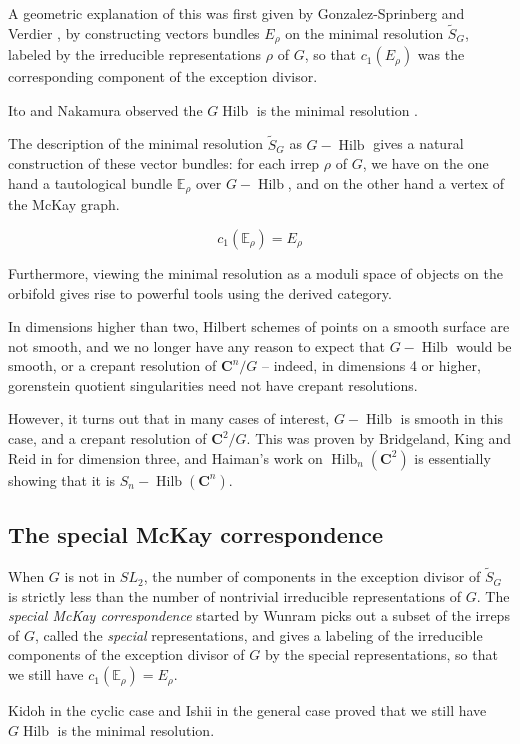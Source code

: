 \documentclass{amsart}[12pt]
\theoremstyle{definition}
\newcommand{\C}{\mathbf{C}}
\DeclareMathOperator{\Hilb}{Hilb}
\begin{document}
A geometric explanation of this was first given by Gonzalez-Sprinberg and Verdier \cite{GSV}, by constructing vectors bundles $E_\rho$ on the minimal resolution $\widetilde{S}_G$, labeled by the irreducible representations $\rho$ of $G$, so that $c_1(E_\rho)$ was the corresponding component of the exception divisor.

Ito and Nakamura observed the $G\Hilb$ is the minimal resolution \cite{IN}.

The description of the minimal resolution $\widetilde{S}_G$ as $G-\Hilb$ gives a natural construction of these vector bundles: for each irrep $\rho$ of $G$, we have on the one hand a tautological bundle $\mathbb{E}_\rho$ over $G-\Hilb$, and on the other hand a vertex of the McKay graph.  

$$c_1(\mathbb{E}_\rho)=E_\rho$$

Furthermore, viewing the minimal resolution as a moduli space of objects on the orbifold gives rise to powerful tools using the derived category.  

In dimensions higher than two, Hilbert schemes of points on a smooth surface are not smooth, and we no longer have any reason to expect that $G-\Hilb$ would be smooth, or a crepant resolution of $\C^n/G$ -- indeed, in dimensions 4 or higher, gorenstein quotient singularities need not have crepant resolutions.

However, it turns out that in many cases of interest, $G-\Hilb$ is smooth in this case, and a crepant resolution of $\C^2/G$.  This was proven by Bridgeland, King and Reid in \cite{BKR} for dimension three, and Haiman's work on $\Hilb_n(\C^2)$ is essentially showing that it is $S_n-\Hilb(\C^n)$.



\subsection{The special McKay correspondence}

When $G$ is not in $SL_2$, the number of components in the exception divisor of $\widetilde{S}_G$ is strictly less than the number of nontrivial irreducible representations of $G$.  The \emph{special McKay correspondence} started by Wunram \cite{wunram} picks out a subset of the irreps of $G$, called the \emph{special} representations, and gives a labeling of the irreducible components of the exception divisor of $G$ by the special representations, so that we still have $c_1(\mathbb{E}_\rho)=E_\rho$.

Kidoh \cite{Kidoh} in the cyclic case and Ishii \cite{ishii} in the general case proved that we still have $G\Hilb$ is the minimal resolution.
\end{document}
